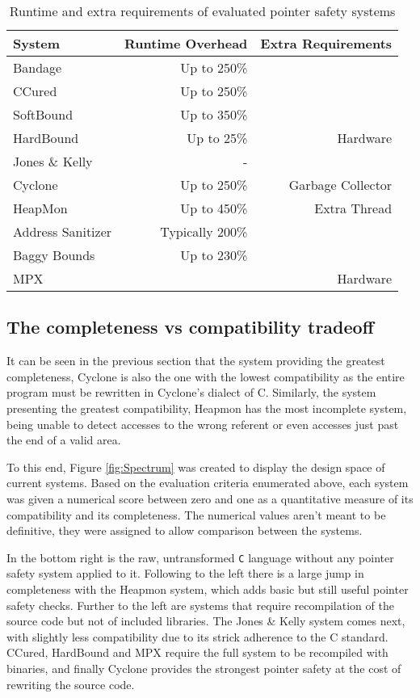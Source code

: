 \begin{table}
\centering
\begin{tabular}{l|r|r}
System & Runtime Overhead & Extra Requirements \\
\hline
Bandage             &Up to 250\%&\\
CCured              &Up to 250\%&\\
SoftBound           &Up to 350\%&\\
HardBound           &Up to 25\%&Hardware\\
Jones \& Kelly      &-&\\
Cyclone             &Up to 250\%&Garbage Collector\\
HeapMon             &Up to 450\%&Extra Thread\\
Address Sanitizer   &Typically 200\%&\\
Baggy Bounds        &Up to 230\%&\\
MPX                 &&Hardware\\
\end{tabular}
\caption{Runtime and extra requirements of evaluated pointer safety systems}
\label{fig:Others}
\end{table}

\subsection{The completeness vs compatibility tradeoff}

It can be seen in the previous section that the system providing the greatest completeness, Cyclone is also the one with the lowest compatibility as the entire program must be rewritten in Cyclone's dialect of C.
Similarly, the system presenting the greatest compatibility, Heapmon has the most incomplete system, being unable to detect accesses to the wrong referent or even accesses just past the end of a valid area.

To this end, Figure \ref{fig:Spectrum} was created to display the design space of current systems.
Based on the evaluation criteria enumerated above, each system was given a numerical score between zero and one as a quantitative measure of its compatibility and its completeness.
The numerical values aren't meant to be definitive, they were assigned to allow comparison between the systems.

In the bottom right is the raw, untransformed \verb!C! language without any pointer safety system applied to it.
Following to the left there is a large jump in completeness with the Heapmon system, which adds basic but still useful pointer safety checks.
Further to the left are systems that require recompilation of the source code but not of included libraries.
The Jones \& Kelly system comes next, with slightly less compatibility due to its strick adherence to the C standard.
CCured, HardBound and MPX require the full system to be recompiled with binaries, and finally Cyclone provides the strongest pointer safety at the cost of rewriting the source code.

